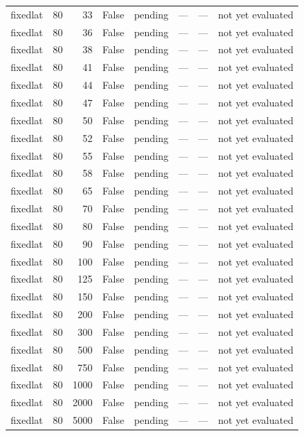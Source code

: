 \begin{tabular}{lrrrlrrl}
fixedlat & 80 & 33 & False & pending & — & — & not yet evaluated \\
fixedlat & 80 & 36 & False & pending & — & — & not yet evaluated \\
fixedlat & 80 & 38 & False & pending & — & — & not yet evaluated \\
fixedlat & 80 & 41 & False & pending & — & — & not yet evaluated \\
fixedlat & 80 & 44 & False & pending & — & — & not yet evaluated \\
fixedlat & 80 & 47 & False & pending & — & — & not yet evaluated \\
fixedlat & 80 & 50 & False & pending & — & — & not yet evaluated \\
fixedlat & 80 & 52 & False & pending & — & — & not yet evaluated \\
fixedlat & 80 & 55 & False & pending & — & — & not yet evaluated \\
fixedlat & 80 & 58 & False & pending & — & — & not yet evaluated \\
fixedlat & 80 & 65 & False & pending & — & — & not yet evaluated \\
fixedlat & 80 & 70 & False & pending & — & — & not yet evaluated \\
fixedlat & 80 & 80 & False & pending & — & — & not yet evaluated \\
fixedlat & 80 & 90 & False & pending & — & — & not yet evaluated \\
fixedlat & 80 & 100 & False & pending & — & — & not yet evaluated \\
fixedlat & 80 & 125 & False & pending & — & — & not yet evaluated \\
fixedlat & 80 & 150 & False & pending & — & — & not yet evaluated \\
fixedlat & 80 & 200 & False & pending & — & — & not yet evaluated \\
fixedlat & 80 & 300 & False & pending & — & — & not yet evaluated \\
fixedlat & 80 & 500 & False & pending & — & — & not yet evaluated \\
fixedlat & 80 & 750 & False & pending & — & — & not yet evaluated \\
fixedlat & 80 & 1000 & False & pending & — & — & not yet evaluated \\
fixedlat & 80 & 2000 & False & pending & — & — & not yet evaluated \\
fixedlat & 80 & 5000 & False & pending & — & — & not yet evaluated \\

\end{tabular}
